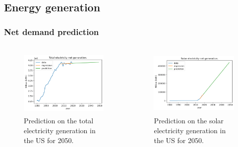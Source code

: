 \subsection{Energy generation}
\begin{frame}
\frametitle{Net demand prediction}
\begin{columns}
    \column[t]{5cm}
	\begin{figure}[htbp!]
		\begin{center}
			\includegraphics[height=3.3cm]{images/us-prediction1}
		\end{center}
		\caption{Prediction on the total electricity generation in the US for 2050.}
	\end{figure}

    \column[t]{5cm}
	\begin{figure}[htbp!]
		\begin{center}
			\includegraphics[height=3.3cm]{images/us-prediction2}
		\end{center}
		\caption{Prediction on the solar electricity generation in the US for 2050.}
	\end{figure}
\end{columns}
\end{frame}


